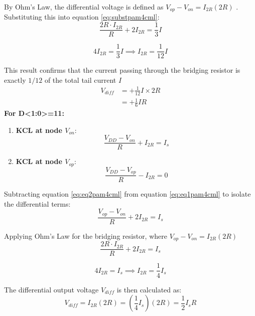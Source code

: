 \documentclass[12pt, a4paper]{report}
\begin{document}
By Ohm's Law, the differential voltage is defined as $V_{op} - V_{on} = I_{2R}(2R)$ . Substituting this into equation \eqref{eq:substpam4cml}:
\begin{equation}
    \frac{2R \cdot I_{2R}}{R} + 2I_{2R} = \frac{1}{3}I
\end{equation}

\begin{equation}
    4I_{2R} = \frac{1}{3}I \implies I_{2R} = \frac{1}{12}I
\end{equation}

This result confirms that the current passing through the bridging resistor is exactly $1/12$ of the total tail current $I$ 
\begin{align}
    V_{diff} &= +\frac{1}{12}I \times 2R \label{eq:vout_step} \\
    &= +\frac{1}{6}IR \label{eq:vout_final}
\end{align}
\noindent \textbf{For D<1:0>=11:} 
\begin{enumerate}
    \item \textbf{KCL at node $V_{on}$}:
    \begin{equation}
        \frac{V_{DD} - V_{on}}{R} + I_{2R} = I_s
        \label{eq:eq1pam4cml}
    \end{equation}
    
    \item \textbf{KCL at node $V_{op}$}:
    \begin{equation}
        \frac{V_{DD} - V_{op}}{R} - I_{2R} = 0
         \label{eq:eq2pam4cml}
    \end{equation}
\end{enumerate}

Subtracting equation \eqref{eq:eq2pam4cml} from equation \eqref{eq:eq1pam4cml} to isolate the differential terms:
\begin{equation}
    \frac{V_{op} - V_{on}}{R} + 2I_{2R} = I_s
\end{equation}

Applying Ohm's Law for the bridging resistor, where $V_{op} - V_{on} = I_{2R}(2R)$ 
\begin{equation}
    \frac{2R \cdot I_{2R}}{R} + 2I_{2R} = I_s
\end{equation}

\begin{equation}
    4I_{2R} = I_s \implies I_{2R} = \frac{1}{4}I_s
\end{equation}

The differential output voltage $V_{diff}$ is then calculated as:
\begin{equation}
    V_{diff} = I_{2R}(2R) = \left( \frac{1}{4}I_s \right)(2R) = \frac{1}{2}I_sR
\end{equation}
\end{document}
